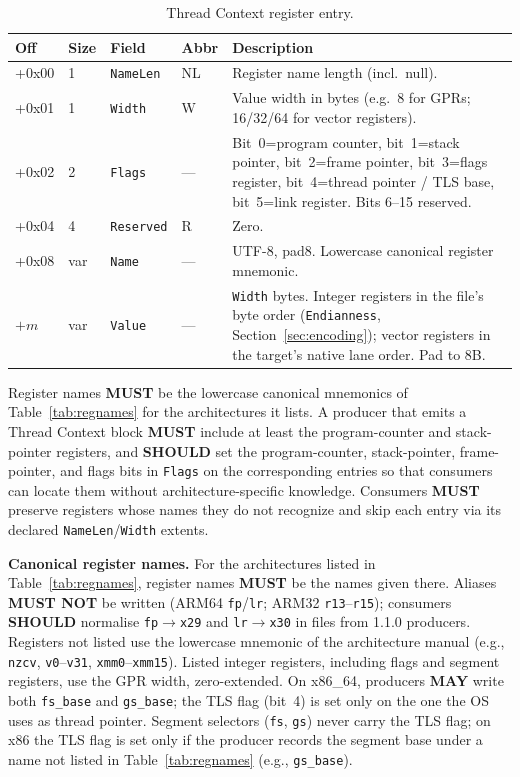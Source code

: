 \documentclass[11pt,a4paper]{article}
\newcommand{\MUST}{\textbf{MUST}}
\newcommand{\MUSTNOT}{\textbf{MUST NOT}}
\newcommand{\SHOULD}{\textbf{SHOULD}}
\newcommand{\MAY}{\textbf{MAY}}
\newcommand{\field}[1]{\texttt{#1}}
\begin{document}
\begin{table}[H]\centering\caption{Thread Context register entry.}\label{tab:threadreg}\small
\begin{tabular}{M M l l p{6cm}}\toprule\textbf{Off}&\textbf{Size}&\textbf{Field}&\textbf{Abbr}&\textbf{Description}\\\midrule
+0x00 & 1 & \field{NameLen} & NL & Register name length (incl.\ null). \\
+0x01 & 1 & \field{Width} & W & Value width in bytes (e.g.\ 8 for GPRs; 16/32/64 for vector registers). \\
+0x02 & 2 & \field{Flags} & --- & Bit~0=program counter, bit~1=stack pointer, bit~2=frame pointer, bit~3=flags register, bit~4=thread pointer / TLS base, bit~5=link register. Bits 6--15 reserved. \\
+0x04 & 4 & \field{Reserved} & R & Zero. \\
+0x08 & var & \field{Name} & --- & UTF-8, pad8. Lowercase canonical register mnemonic. \\
$+m$ & var & \field{Value} & --- & \field{Width} bytes. Integer registers in the file's byte order (\field{Endianness}, Section~\ref{sec:encoding}); vector registers in the target's native lane order. Pad to 8B. \\\bottomrule
\end{tabular}\end{table}

Register names \MUST{} be the lowercase canonical mnemonics of Table~\ref{tab:regnames} for the architectures it lists. A producer that emits a Thread Context block \MUST{} include at least the program-counter and stack-pointer registers, and \SHOULD{} set the program-counter, stack-pointer, frame-pointer, and flags bits in \field{Flags} on the corresponding entries so that consumers can locate them without architecture-specific knowledge. Consumers \MUST{} preserve registers whose names they do not recognize and skip each entry via its declared \field{NameLen}/\field{Width} extents.

\noindent\textbf{Canonical register names.} For the architectures listed in Table~\ref{tab:regnames}, register names \MUST{} be the names given there. Aliases \MUSTNOT{} be written (ARM64 \texttt{fp}/\texttt{lr}; ARM32 \texttt{r13}--\texttt{r15}); consumers \SHOULD{} normalise \texttt{fp}$\to$\texttt{x29} and \texttt{lr}$\to$\texttt{x30} in files from 1.1.0 producers. Registers not listed use the lowercase mnemonic of the architecture manual (e.g., \texttt{nzcv}, \texttt{v0}--\texttt{v31}, \texttt{xmm0}--\texttt{xmm15}). Listed integer registers, including flags and segment registers, use the GPR width, zero-extended. On x86\_64, producers \MAY{} write both \texttt{fs\_base} and \texttt{gs\_base}; the TLS flag (bit~4) is set only on the one the OS uses as thread pointer. Segment selectors (\texttt{fs}, \texttt{gs}) never carry the TLS flag; on x86 the TLS flag is set only if the producer records the segment base under a name not listed in Table~\ref{tab:regnames} (e.g., \texttt{gs\_base}).
\end{document}
